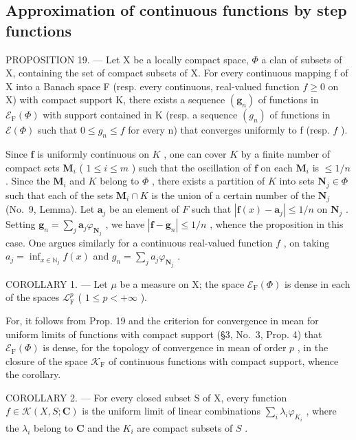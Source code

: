 \subsection{Approximation of continuous functions by step functions}

PROPOSITION 19. --- Let X be a locally compact space, \(\Phi\) a clan of subsets of X, containing the set of compact subsets of X. For every continuous mapping f of X into a Banach space F (resp. every continuous, real-valued function \(f \geqslant 0\) on X) with compact support K, there exists a sequence \((\mathbf{g}_n)\) of functions in \(\mathcal{E}_{\mathrm{F}}(\Phi)\) with support contained in K (resp. a sequence \((g_n)\) of functions in \(\mathcal{E}(\Phi)\) such that \(0 \leqslant g_n \leqslant f\) for every n) that converges uniformly to f (resp. \(f\) ).

Since \(\mathbf{f}\) is uniformly continuous on \(K\) , one can cover \(K\) by a finite number of compact sets \(\mathbf{M}_i\) ( \(1 \leqslant i \leqslant m\) ) such that the oscillation of \(\mathbf{f}\) on each \(\mathbf{M}_i\) is \(\leqslant 1/n\) . Since the \(\mathbf{M}_i\) and \(K\) belong to \(\Phi\) , there exists a partition of \(K\) into sets \(\mathbf{N}_j \in \Phi\) such that each of the sets \(\mathbf{M}_i \cap K\) is the union of a certain number of the \(\mathbf{N}_j\) (No.~9, Lemma). Let \(\mathbf{a}_j\) be an element of \(F\) such that \(|\mathbf{f}(x) - \mathbf{a}_j| \leqslant 1/n\) on \(\mathbf{N}_j\) . Setting \(\mathbf{g}_n = \sum_j \mathbf{a}_j \varphi_{\mathbf{N}_j}\) , we have \(|\mathbf{f} - \mathbf{g}_n| \leqslant 1/n\) , whence the proposition in this case. One argues similarly for a continuous real-valued function \(f\) , on taking \(a_j = \inf_{x \in \mathbb{N}_j} f(x)\) and \(g_n = \sum_j a_j \varphi_{\mathbf{N}_j}\) .

COROLLARY 1. --- Let \(\mu\) be a measure on X; the space \(\mathcal{E}_{\mathrm{F}}(\Phi)\) is dense in each of the spaces \(\mathcal{L}_{\mathrm{F}}^{p}\) ( \(1 \leqslant p < +\infty\) ).

For, it follows from Prop. 19 and the criterion for convergence in mean for uniform limits of functions with compact support (§3, No.~3, Prop. 4) that \(\mathcal{E}_{\mathrm{F}}(\Phi)\) is dense, for the topology of convergence in mean of order \(p\) , in the closure of the space \(\mathcal{K}_{\mathrm{F}}\) of continuous functions with compact support, whence the corollary.

COROLLARY 2. --- For every closed subset S of X, every function \(f \in \mathcal{K}(X, S; \mathbf{C})\) is the uniform limit of linear combinations \(\sum_{i} \lambda_i \varphi_{K_i}\) , where the \(\lambda_i\) belong to \(\mathbf{C}\) and the \(K_i\) are compact subsets of \(S\) .

